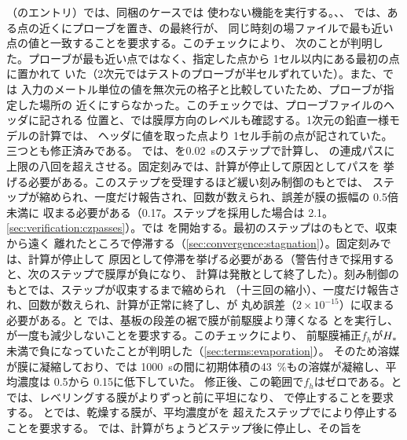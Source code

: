 （のエントリ）では、同梱のケースでは
使わない機能を実行する。、、
では、ある点の近くにプローブを置き、の最終行が、
同じ時刻の場ファイルで最も近い点の値と一致することを要求する。このチェックにより、
次のことが判明した。プローブが最も近い点ではなく、指定した点から 1セル以内にある最初の点に置かれて
いた（2次元ではテストのプローブが半セルずれていた）。また、では
入力のメートル単位の値を無次元の格子と比較していたため、プローブが指定した場所の
近くにすらなかった。このチェックでは、プローブファイルのヘッダに記される
位置と、では膜厚方向のレベルも確認する。1次元の鉛直一様モデルの計算では、
ヘッダに値を取った点より 1セル手前の点が記されていた。三つとも修正済みである。
では、を\SI{0.02}{\second}のステップで計算し、
の連成パスに上限の八回を超えさせる。固定刻みでは、計算が停止して原因としてパスを
挙げる必要がある。このステップを受理するほど緩い刻み制御のもとでは、
ステップが縮められ、一度だけ報告され、回数が数えられ、誤差が膜の振幅の 0.5倍未満に
収まる必要がある（0.17。ステップを採用した場合は 2.1。
\cref{sec:verification:czpasses}）。では
を開始する。最初のステップはのもとで、収束から遠く
離れたところで停滞する（\cref{sec:convergence:stagnation}）。固定刻みでは、計算が停止して
原因として停滞を挙げる必要がある（警告付きで採用すると、次のステップで膜厚が負になり、
計算は発散として終了した）。刻み制御のもとでは、ステップが収束するまで縮められ
（十三回の縮小）、一度だけ報告され、回数が数えられ、計算が正常に終了し、が
丸め誤差（$2\times10^{-15}$）に収まる必要がある。と
では、基板の段差の裾で膜が前駆膜より薄くなる
とを実行し、
が一度も減少しないことを要求する。このチェックにより、
前駆膜補正$f_h$が$H_{*}$未満で負になっていたことが判明した（\cref{sec:terms:evaporation}）。
そのため溶媒が膜に凝縮しており、では
\SI{1000}{\second}の間に初期体積の\SI{43}{\percent}もの溶媒が凝縮し、平均濃度は 0.5から
0.15に低下していた。
修正後、この範囲で$f_h$はゼロである。と
では、レベリングする膜がよりずっと前に平坦になり、
で停止することを要求する。
とでは、乾燥する膜が、平均濃度がを
超えたステップでにより停止することを要求する。
では、計算がちょうどステップ後に停止し、その旨を
